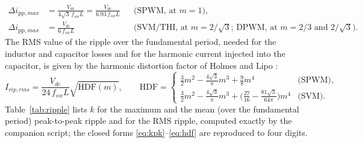 \documentclass[10pt,a4paper]{scrartcl}
\newcommand{\Vdc}{V_{dc}}
\newcommand{\fsw}{f_{sw}}
\newcommand{\pp}{\mathrm{pp}}
\begin{document}
\begin{onehalfspace}
\begin{align}
\Delta i_{\pp,max} &= \frac{\Vdc}{4\sqrt3\,\fsw L} = \frac{\Vdc}{6.93\,\fsw L} && \text{(SPWM, at } m = 1), \label{eq:worst}\\
\Delta i_{\pp,max} &= \frac{\Vdc}{6\,\fsw L} && \text{(SVM/THI, at } m = 2/\sqrt3\text{; DPWM, at } m = 2/3 \text{ and } 2/\sqrt3). \nonumber
\end{align}
The RMS value of the ripple over the fundamental period, needed for the inductor and capacitor losses and for the harmonic current injected into the capacitor, is given by the harmonic distortion factor of Holmes and Lipo \cite{holmes2003}:
\begin{equation}
I_{rip,rms} = \frac{\Vdc}{24\,\fsw L}\sqrt{\mathrm{HDF}(m)},\qquad
\mathrm{HDF} =
\begin{cases}
\tfrac32 m^2 - \tfrac{4\sqrt3}{\pi} m^3 + \tfrac98 m^4 & \text{(SPWM)},\\[4pt]
\tfrac32 m^2 - \tfrac{4\sqrt3}{\pi} m^3 + \Big(\tfrac{27}{16} - \tfrac{81\sqrt3}{64\pi}\Big) m^4 & \text{(SVM)}.
\end{cases}
\label{eq:hdf}
\end{equation}
Table~\ref{tab:ripple} lists $k$ for the maximum and the mean (over the fundamental period) peak-to-peak ripple and for the RMS ripple, computed exactly by the companion script; the closed forms \eqref{eq:kpk}--\eqref{eq:hdf} are reproduced to four digits.


\end{onehalfspace}
\end{document}
